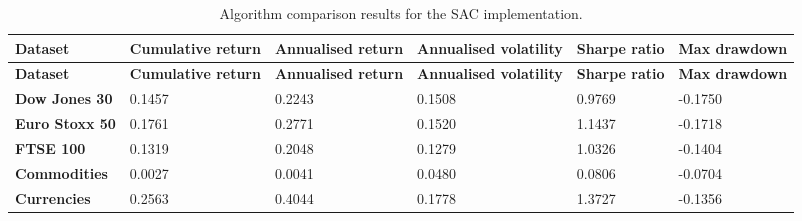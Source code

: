 \begin{longtable}{|l|p{2.1cm}|p{2.1cm}|p{2.1cm}|p{1.5cm}|p{2cm}|}
    \caption{Algorithm comparison results for the SAC implementation.}
    \label{tab:experiment_algorithms_sac}
    \\ 
    \hline
    \textbf{Dataset} & \textbf{Cumulative return} & \textbf{Annualised return} & \textbf{Annualised volatility} & \textbf{Sharpe ratio} & \textbf{Max drawdown}  \\ \midrule
    \endfirsthead

    \hline
    \textbf{Dataset} & \textbf{Cumulative return} & \textbf{Annualised return} & \textbf{Annualised volatility} & \textbf{Sharpe ratio} & \textbf{Max drawdown}  \\ \midrule
    \endhead

    \endfoot
    \hline

    \textbf{Dow Jones 30} & 0.1457 & 0.2243 & 0.1508 & 0.9769 & -0.1750 \\ \hline
    \textbf{Euro Stoxx 50} & 0.1761 & 0.2771 & 0.1520 & 1.1437 & -0.1718 \\ \hline
    \textbf{FTSE 100} & 0.1319 & 0.2048 & 0.1279 & 1.0326 & -0.1404 \\ \hline
    \textbf{Commodities} & 0.0027 & 0.0041 & 0.0480 & 0.0806 & -0.0704 \\ \hline
    \textbf{Currencies} & 0.2563 & 0.4044 & 0.1778 & 1.3727 & -0.1356 \\ \hline
\end{longtable}